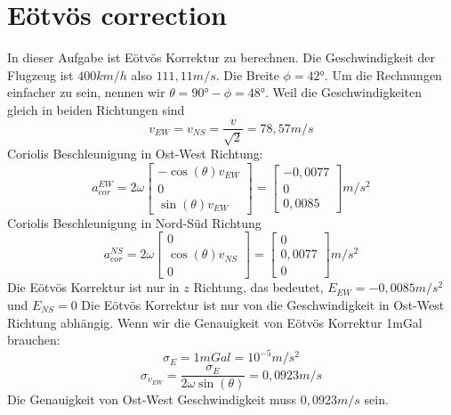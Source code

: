 \documentclass[12pt]{article}
\begin{document}
\section{Eötvös correction}
In dieser Aufgabe ist Eötvös Korrektur zu berechnen. Die Geschwindigkeit der Flugzeug ist $400km/h$ also $111,11m/s$. Die Breite $\phi = 42°$. Um die Rechnungen einfacher zu sein, nennen wir $\theta = 90° - \phi = 48°$.
\newline
\newline
Weil die Geschwindigkeiten gleich in beiden Richtungen sind 
\begin{equation*}
v_{EW} = v_{NS} = \frac{v}{\sqrt{2}} = 78,57 m/s
\end{equation*}
Coriolis Beschleunigung in Ost-West Richtung:
\begin{equation*}
a^{EW}_{cor} = 2 \omega \begin{bmatrix} - \cos (\theta) v_{EW}\\ 0\\ \sin (\theta) v_{EW} \end{bmatrix}
= \begin{bmatrix} -0,0077\\ 0\\ 0,0085 \end{bmatrix} m/s^2
\end{equation*}
Coriolis Beschleunigung in Nord-Süd Richtung
\begin{equation*}
a^{NS}_{cor} = 2 \omega \begin{bmatrix} 0\\ \cos (\theta) v_{NS}\\ 0 \end{bmatrix} = \begin{bmatrix} 0\\ 0,0077\\ 0 \end{bmatrix} m/s^2
\end{equation*}
Die Eötvös Korrektur ist nur in $z$ Richtung, das bedeutet, $E_{EW} = -0,0085 m/s^2$ und $E_{NS} = 0$
\newline
\newline
Die Eötvös Korrektur ist nur von die Geschwindigkeit in Ost-West Richtung abhängig. Wenn wir die Genauigkeit von Eötvös Korrektur 1mGal brauchen: 
\begin{equation*}
\sigma_E = 1mGal = 10^{-5} m/s^2
\end{equation*}
\begin{equation*}
\sigma_{v_{EW}} = \frac{\sigma_E}{2 \omega \sin(\theta)} = 0,0923 m/s
\end{equation*}
Die Genauigkeit von Ost-West Geschwindigkeit muss $0,0923 m/s$ sein.
\end{document}
